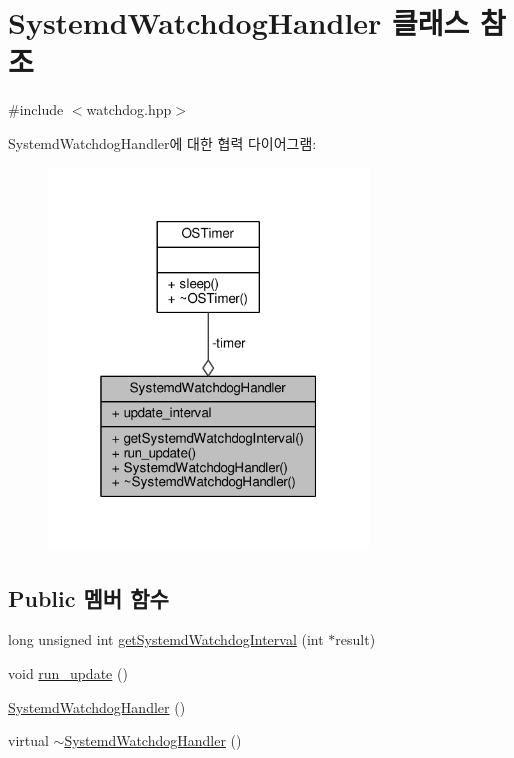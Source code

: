 \hypertarget{class_systemd_watchdog_handler}{}\section{Systemd\+Watchdog\+Handler 클래스 참조}
\label{class_systemd_watchdog_handler}


{\ttfamily \#include $<$watchdog.\+hpp$>$}



Systemd\+Watchdog\+Handler에 대한 협력 다이어그램\+:
\nopagebreak
\begin{figure}[H]
\begin{center}
\leavevmode
\includegraphics[width=241pt]{class_systemd_watchdog_handler__coll__graph}
\end{center}
\end{figure}
\subsection*{Public 멤버 함수}
\begin{DoxyCompactItemize}
\item 
long unsigned int \hyperlink{class_systemd_watchdog_handler_a82224f14cd51cc5cc7d0b708b2e94e46}{get\+Systemd\+Watchdog\+Interval} (int $\ast$result)
\item 
void \hyperlink{class_systemd_watchdog_handler_a53294a197b179f32e6cf5730078cb735}{run\+\_\+update} ()
\item 
\hyperlink{class_systemd_watchdog_handler_a68ffc92bdd1fb15fcfbb95d4b7996445}{Systemd\+Watchdog\+Handler} ()
\item 
virtual \hyperlink{class_systemd_watchdog_handler_a2b478de114e86ce8c2c976d3ec28e4ea}{$\sim$\+Systemd\+Watchdog\+Handler} ()
\end{DoxyCompactItemize}
